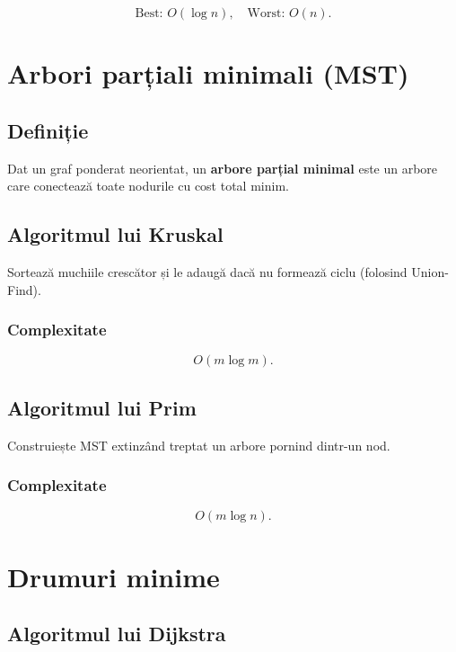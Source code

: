 \documentclass[12pt]{article}
\begin{document}
\[
\text{Best: } O(\log n),\quad
\text{Worst: } O(n).
\]



\section{Arbori parțiali minimali (MST)}

\subsection{Definiție}

Dat un graf ponderat neorientat, un \textbf{arbore parțial minimal} este un arbore
care conectează toate nodurile cu cost total minim.

\subsection{Algoritmul lui Kruskal}

Sortează muchiile crescător și le adaugă dacă nu formează ciclu (folosind Union-Find).

\subsubsection*{Complexitate}



\[
O(m \log m).
\]



\subsection{Algoritmul lui Prim}

Construiește MST extinzând treptat un arbore pornind dintr-un nod.

\subsubsection*{Complexitate}



\[
O(m \log n).
\]



\section{Drumuri minime}

\subsection{Algoritmul lui Dijkstra}
\end{document}
